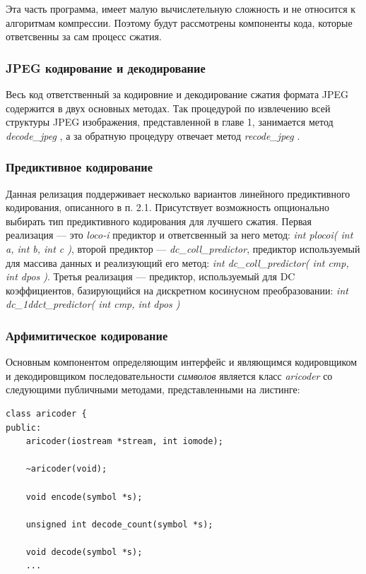 \documentclass{matmex-diploma-custom}
\begin{document}
  Эта часть программа, имеет малую вычислетельную сложность и не относится к алгоритмам компрессии. Поэтому будут рассмотрены компоненты кода, которые ответсвенны за сам процесс сжатия.

\subsubsection{JPEG кодирование и декодирование}
Весь код ответственный за кодировние  и декодирование сжатия формата JPEG содержится в двух основных методах. Так процедурой по извлечению всей структуры JPEG изображения, представленной в главе 1, занимается метод \emph{ decode\_jpeg }, а за обратную процедуру отвечает метод \emph{ recode\_jpeg }.

\subsubsection{Предиктивное кодирование}
Данная релизация поддерживает несколько вариантов линейного предиктивного кодирования, описанного в п. 2.1. Присутствует возможность опционально выбирать тип предиктивного кодирования для лучшего сжатия.
    Первая реализация --- это \emph{loco-i} предиктор и ответсвенный за него метод: \emph{int plocoi( int a, int b, int c )}, второй предиктор --- \emph{dc\_coll\_predictor}, предиктор используемый для массива данных и реализующий его метод: \emph{int dc\_coll\_predictor( int cmp, int dpos )}. Третья реализация --- предиктор, используемый для DC коэффициентов, базирующийся на дискретном косинусном преобразовании: \emph{int dc\_1ddct\_predictor( int cmp, int dpos )}
\subsubsection{Арфимитическое кодирование}
Основным компонентом определяющим интерфейс и являющимся кодировщиком и декодировщиком последовательности \emph{символов} является класс \emph{aricoder} со следующими публичными методами, представленными на листинге:


\begin{lstlisting}
class aricoder {
public:
    aricoder(iostream *stream, int iomode);

    ~aricoder(void);

    void encode(symbol *s);

    unsigned int decode_count(symbol *s);

    void decode(symbol *s);
    ...
\end{lstlisting}
\end{document}
